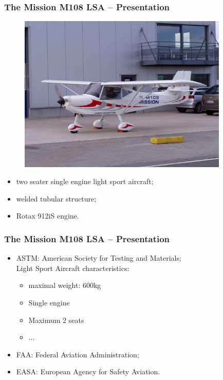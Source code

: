 \documentclass{beamer}
\begin{document}
\begin{frame}\frametitle{The Mission M108 LSA -- Presentation}

\begin{figure}[ht!]
	\begin{center}
		\includegraphics[width=10cm, trim = 0cm 1.5cm 0cm 2cm,clip]{pics/M108BIS.JPG}
		\label{fig:M108}
	\end{center}
\end{figure}

  \begin{itemize}
    \item two seater single engine light sport aircraft;
    \item welded tubular structure;
    \item Rotax 912iS engine.
  \end{itemize}
\end{frame}

\begin{frame}\frametitle{The Mission M108 LSA -- Presentation}
  \begin{itemize}
    \item ASTM: American Society for Testing and Materials;\\
Light Sport Aircraft characteristics:
\begin{itemize}
\item maximal weight: 600kg
\item Single engine
\item Maximum 2 seats
\item ...
\end{itemize}
    \item FAA: Federal Aviation Administration;
    \item EASA: European Agency for Safety Aviation.
  \end{itemize}
\end{frame}
\end{document}

